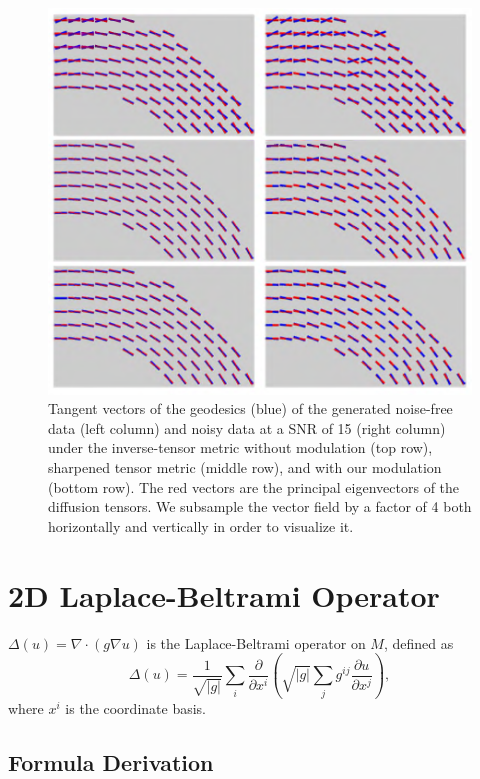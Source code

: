 \documentclass{article}
\theoremstyle{definition}
\theoremstyle{plain}
\begin{document}
\begin{figure}[H]
    \centering
    \includegraphics[scale=0.5]{figure/teneigen.png}
    \caption{Tangent vectors of the geodesics (blue) of the generated noise-free data (left column) and noisy data at a SNR of 15 (right column) under the inverse-tensor metric without modulation (top row), sharpened tensor metric (middle row), and with our modulation (bottom row). The red vectors are the principal eigenvectors of the diffusion tensors. We subsample the vector field by a factor of 4 both horizontally and vertically in order to visualize it.}
\end{figure}

\section{2D Laplace-Beltrami Operator}
$\Delta(u)=\nabla\cdot(g\nabla u)$ is the Laplace-Beltrami operator on $M$, defined as
\begin{equation}
    \Delta(u)=\frac{1}{\sqrt{|g|}}\sum_i\frac{\partial}{\partial x^i}\left(\sqrt{|g|}\sum_j g^{ij}\frac{\partial u}{\partial x^j}\right),
\end{equation}
where $x^i$ is the coordinate basis.
\subsection{Formula Derivation}
\end{document}
